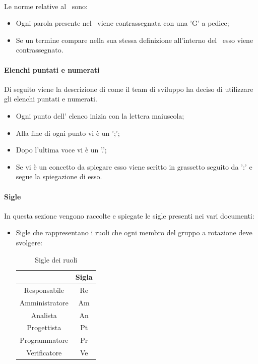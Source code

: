 \paragraph{\docNameGlo}
Le norme relative al \docNameGloLow\ sono:
\begin{itemize}
    \item Ogni parola presente nel \docNameGloLow\ viene contrassegnata con una 'G' a pedice;
    \item Se un termine compare nella sua stessa definizione all'interno del \docNameGloLow\ esso viene contrassegnato.
\end{itemize}

\paragraph{Elenchi puntati e numerati}
Di seguito viene la descrizione di come il team di sviluppo ha deciso di utilizzare gli elenchi puntati e numerati.
\begin {itemize}
    \item Ogni punto dell' elenco inizia con la lettera maiuscola;
    \item Alla fine di ogni punto vi è un ';';
    \item Dopo l'ultima voce vi è un '.';
    \item Se vi è un concetto da spiegare esso viene scritto in grassetto seguito da ':' e segue la spiegazione di esso.
\end {itemize}
\paragraph{Sigle}
In questa sezione vengono raccolte e spiegate le sigle presenti nei vari documenti:
\begin{itemize}
    \item Sigle che rappresentano i ruoli che ogni membro del gruppo a rotazione deve svolgere:
    \begin{table}[H]
        \centering
        \renewcommand{\arraystretch}{1.8}
        \begin{tabular}{c|c}
          \rowcolor[HTML]{125E28} 
          \multicolumn{1}{c}{\color[HTML]{FFFFFF}\textbf{Ruolo}}
          & \multicolumn{1}{c}{\color[HTML]{FFFFFF}\textbf{Sigla}}\\
          \hline
          Responsabile      & Re\\
          Amministratore    & Am\\
          Analista          & An\\
          Progettista       & Pt\\
          Programmatore     & Pr\\
          Verificatore      & Ve
        \end{tabular}
        \caption{Sigle dei ruoli}
      \end{table}
\end{itemize}
